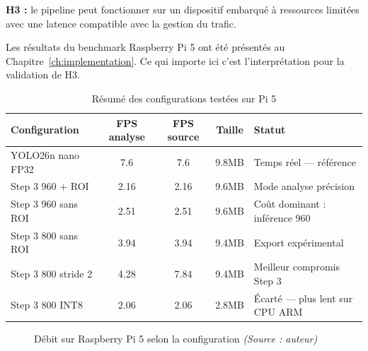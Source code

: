 \textbf{H3 :} le pipeline peut fonctionner
sur un dispositif embarqué à ressources
limitées avec une latence compatible
avec la gestion du trafic.

Les résultats du benchmark Raspberry Pi 5
ont été présentés au Chapitre~\ref{ch:implementation}.
Ce qui importe ici c'est l'interprétation
pour la validation de H3.

\begin{table}[H]
\centering
\caption{Résumé des configurations
         testées sur Pi 5}
\scriptsize
\renewcommand{\arraystretch}{1.05}
\begin{tabularx}{\textwidth}{lcccX}
\toprule
\textbf{Configuration} &
\textbf{FPS analyse} &
\textbf{FPS source} &
\textbf{Taille} &
\textbf{Statut} \\
\midrule
YOLO26n nano FP32 &
7.6 & 7.6 & 9.8MB &
Temps réel — référence \\
Step 3 960 + ROI &
2.16 & 2.16 & 9.6MB &
Mode analyse précision \\
Step 3 960 sans ROI &
2.51 & 2.51 & 9.6MB &
Coût dominant : inférence 960 \\
Step 3 800 sans ROI &
3.94 & 3.94 & 9.4MB &
Export expérimental \\
Step 3 800 stride 2 &
4.28 & 7.84 & 9.4MB &
Meilleur compromis Step 3 \\
Step 3 800 INT8 &
2.06 & 2.06 & 2.8MB &
Écarté — plus lent sur CPU ARM \\
\bottomrule
\end{tabularx}
\renewcommand{\arraystretch}{1}
\label{tab:rpi5_summary}
\end{table}

\begin{figure}[H]
\centering
{}
\caption{Débit sur Raspberry Pi 5 selon
         la configuration
         \textit{(Source : auteur)}}
\label{fig:fps_chart}
\end{figure}

